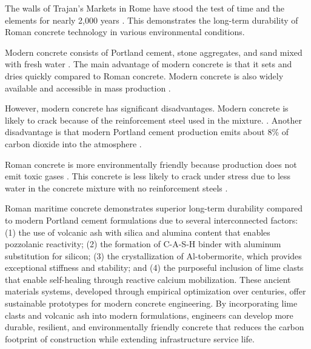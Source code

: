 The walls of Trajan's Markets in Rome have stood the test of time and the elements for nearly 2,000 years . This demonstrates the long-term durability of Roman concrete technology in various environmental conditions.

Modern concrete consists of Portland cement, stone aggregates, and sand mixed with fresh water . The main advantage of modern concrete is that it sets and dries quickly compared to Roman concrete. Modern concrete is also widely available and accessible in mass production .

However, modern concrete has significant disadvantages. Modern concrete is likely to crack because of the reinforcement steel used in the mixture.  . Another disadvantage is that modern Portland cement production emits about 8\% of carbon dioxide into the atmosphere .

Roman concrete is more environmentally friendly because production does not emit toxic gases . This concrete is less likely to crack under stress due to less water in the concrete mixture with no reinforcement steels .

Roman maritime concrete demonstrates superior long-term durability compared to modern Portland cement formulations due to several interconnected factors: (1) the use of volcanic ash with silica and alumina content that enables pozzolanic reactivity; (2) the formation of C-A-S-H binder with aluminum substitution for silicon; (3) the crystallization of Al-tobermorite, which provides exceptional stiffness and stability; and (4) the purposeful inclusion of lime clasts that enable self-healing through reactive calcium mobilization. These ancient materials systems, developed through empirical optimization over centuries, offer sustainable prototypes for modern concrete engineering. By incorporating lime clasts and volcanic ash into modern formulations, engineers can develop more durable, resilient, and environmentally friendly concrete that reduces the carbon footprint of construction while extending infrastructure service life.


